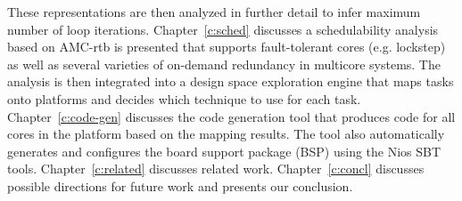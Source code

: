 	These representations are then analyzed in further detail to infer maximum number of loop iterations. 
	Chapter~\ref{c:sched} discusses a schedulability analysis based on AMC-rtb is presented that supports fault-tolerant cores (e.g. lockstep) as well as several varieties of on-demand redundancy in multicore systems. 
	The analysis is then integrated into a design space exploration engine that maps tasks onto platforms and decides which technique to use for each task.
	Chapter~\ref{c:code-gen} discusses the code generation tool that produces code for all cores in the platform based on the mapping results. 
	The tool also automatically generates and configures the board support package (BSP) using the Nios SBT tools. 
	Chapter~\ref{c:related} discusses related work. 
	Chapter~\ref{c:concl} discusses possible directions for future work and presents our conclusion.
